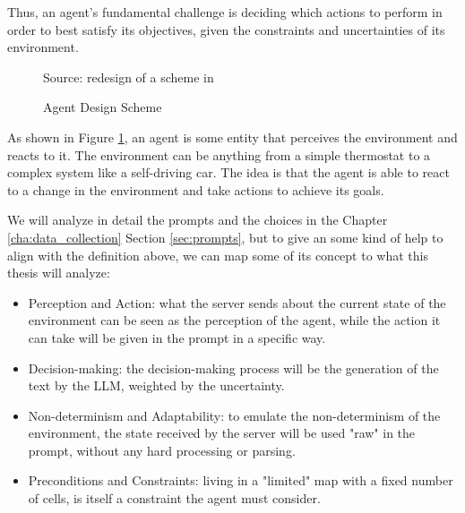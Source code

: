 Thus, an agent's fundamental challenge is deciding which actions to perform in
order to best satisfy its objectives, given the constraints and uncertainties of
its environment.

\begin{figure}[h!]
  \centering
  \caption{Agent Design Scheme}
  { Source: redesign of a scheme in \cite{wooldridge2002multiagent}} \label{fig:agent_scheme}
\end{figure}

As shown in Figure \ref{fig:agent_scheme}, an agent is some entity that perceives
the environment and reacts to it. The environment can be anything from a simple
thermostat to a complex system like a self-driving car. The idea is that the agent
is able to react to a change in the environment and take actions to achieve its goals.

We will analyze in detail the prompts and the choices in the Chapter \ref{cha:data_collection}
Section \ref{sec:prompts}, but to give an some kind of help to align with the
definition above, we can map some of its concept to what this thesis will analyze:
\begin{itemize}
  \item Perception and Action: what the server sends about the current state of
    the environment can be seen as the perception of the agent, while the action
    it can take will be given in the prompt in a specific way.

  \item Decision-making: the decision-making process will be the generation of
    the text by the LLM, weighted by the uncertainty.

  \item Non-determinism and Adaptability: to emulate the non-determinism of the
    environment, the state received by the server will be used "raw" in the prompt,
    without any hard processing or parsing.

  \item Preconditions and Constraints: living in a "limited" map with a fixed
    number of cells, is itself a constraint the agent must consider.
\end{itemize}

